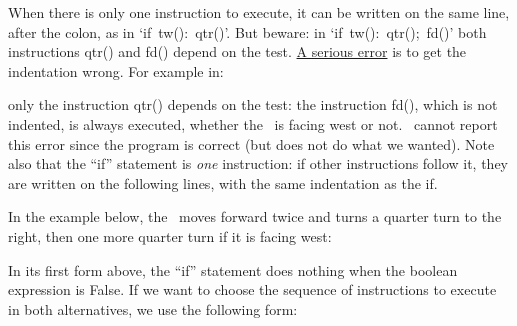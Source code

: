 When there is only one instruction to execute, it can be written on the same line, after the
colon, as in `{\mcl if}\ {\idt tw():\ qtr()}'. But beware: in
`{\mcl if}\ {\idt tw():\ qtr();\ fd()}' both instructions {\idt qtr()} and {\idt fd()} depend on the test.
\underline{A serious error} is to get the indentation wrong. For example in:
{
\parindent {}
\medskip

\vspace{\neglskip}\mbox{}\par
\vspace{\neglskip}\mbox{\blc \blk{}}\par
\vspace{\neglskip}\mbox{}\par

\medskip }
\noindent only the instruction {\idt qtr()} depends on the test: the instruction {\idt fd()},
which is not indented, is always ex\-e\-cut\-ed, whether the \robot\ is facing west or not.
\python\ cannot report this error since the program is correct (but does not do
what we wanted). Note also that the ``if'' statement is {\em one} instruction:
if other instructions follow it, they are written on the following lines, with the same
indentation as the {\mcl if}.


In the example below, the \robot\ moves forward twice and turns a quarter turn to the right, then
one more quarter turn 
if it is facing west:

\vspace{\baselineskip}

 {\raggedright 
 
}
 
 In its first form above, the ``if'' statement does nothing when the boolean expression
 is {\mcl False}. If we want to choose the sequence of instructions to execute in both
 alternatives, we use the following form:
 
